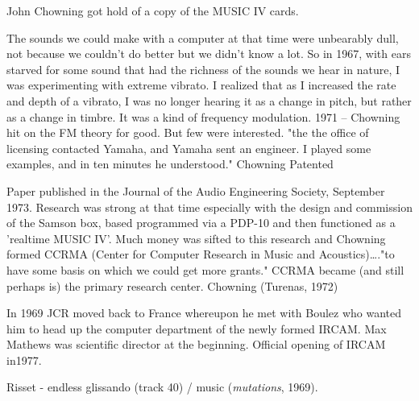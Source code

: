 John Chowning got hold of a copy of the MUSIC IV cards.

The sounds we could make with a computer at that time were unbearably dull, not because we couldn't do better but we didn't know a lot. So in 1967, with ears starved for some sound that had the richness of the sounds we hear in nature, I was experimenting with extreme vibrato. I realized that as I increased the rate and depth of a vibrato, I was no longer hearing it as a change in pitch, but rather as a change in timbre. It was a kind of frequency modulation.
1971 – Chowning hit on the FM theory for good. But few were interested. "the the office of licensing contacted Yamaha, and Yamaha sent an engineer. I played some examples, and in ten minutes he understood." Chowning Patented

Paper published in the Journal of the Audio Engineering Society, September 1973. Research was strong at that time especially with the design and commission of the Samson box, based programmed via a PDP-10 and then functioned as a 'realtime MUSIC IV'. Much money was sifted to this research and Chowning formed CCRMA (Center for Computer Research in Music and Acoustics)…."to have some basis on which we could get more grants." CCRMA became (and still perhaps is) the primary research center. Chowning (Turenas, 1972)

In 1969 JCR moved back to France whereupon he met with Boulez who wanted him to head up the computer department of the newly formed IRCAM. Max Mathews was scientific director at the beginning. Official opening of IRCAM in1977.

Risset - endless glissando (track 40) / music (\textit{mutations}, 1969).

